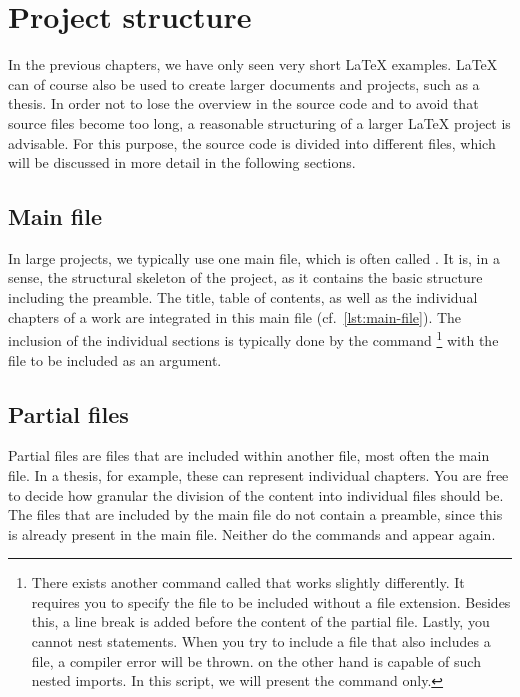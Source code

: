 \chapter{Project structure}
\label{sec:project-structure}

In the previous chapters, we have only seen very short \LaTeX{} examples. 
\LaTeX{} can of course also be used to create larger documents and projects, such as a thesis. 
In order not to lose the overview in the source code and to avoid that source files become too long, a reasonable structuring of a larger \LaTeX{} project is advisable.
For this purpose, the source code is divided into different files, which will be discussed in more detail in the following sections.

\section{Main file}

In large projects, we typically use one main file, which is often called . 
It is, in a sense, the structural skeleton of the project, as it contains the basic structure including the preamble. 
The title, table of contents, as well as the individual chapters of a work are integrated in this main file (cf.\ \cref{lst:main-file}). 
The inclusion of the individual sections is typically done by the  command
\footnote{There exists another command called  that works slightly differently. It requires you to specify the file to be included without a file extension. Besides this, a line break is added before the content of the partial file. Lastly, you cannot nest  statements. When you try to include a file that also includes a file, a compiler error will be thrown.  on the other hand is capable of such nested imports. In this script, we will present the  command only.}
with the file to be included as an argument.


\section{Partial files}
Partial files are files that are included within another file, most often the main file.
In a thesis, for example, these can represent individual chapters.
You are free to decide how granular the division of the content into individual files should be.
The files that are included by the main file do not contain a preamble, since this is already present in the main file.
Neither do the commands  and  appear again.
